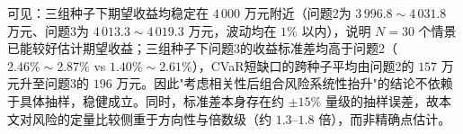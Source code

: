 可见：三组种子下期望收益均稳定在 $4\,000$ 万元附近（问题2为 $3\,996.8\sim4\,031.8$ 万元、问题3为 $4\,013.3\sim4\,019.3$ 万元，波动均在 $1\%$ 以内），说明 $N=30$ 个情景已能较好估计期望收益；三组种子下问题3的收益标准差均高于问题2（$2.46\%\sim2.87\%$ vs $1.40\%\sim2.61\%$），CVaR短缺口的跨种子平均由问题2的 $157$ 万元升至问题3的 $196$ 万元。因此"考虑相关性后组合风险系统性抬升"的结论不依赖于具体抽样，稳健成立。同时，标准差本身存在约 $\pm15\%$ 量级的抽样误差，故本文对风险的定量比较侧重于方向性与倍数级（约 $1.3$--$1.8$ 倍），而非精确点估计。
